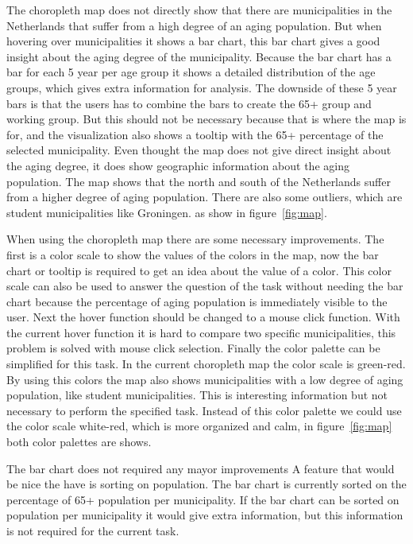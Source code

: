 The choropleth map does not directly show that there are municipalities in the Netherlands that suffer from a high degree of an aging population.
But when hovering over municipalities it shows a bar chart, this bar chart gives a good insight about the aging degree of the municipality.
Because the bar chart has a bar for each 5 year per age group it shows a detailed distribution of the age groups, which gives extra information for analysis.
The downside of these 5 year bars is that the users has to combine the bars to create the 65+ group and working group.
But this should not be necessary because that is where the map is for, and the visualization also shows a tooltip with the 65+ percentage of the selected municipality.
Even thought the map does not give direct insight about the aging degree, it does show geographic information about the aging population.
The map shows that the north and south of the Netherlands suffer from a higher degree of aging population.
There are also some outliers, which are student municipalities like Groningen. as show in figure~\ref{fig:map}.

When using the choropleth map there are some necessary improvements.
The first is a color scale to show the values of the colors in the map, now the bar chart or tooltip is required to get an idea about the value of a color.
This color scale can also be used to answer the question of the task without needing the bar chart because the percentage of aging population is immediately visible to the user.
Next the hover function should be changed to a mouse click function.
With the current hover function it is hard to compare two specific municipalities, this problem is solved with mouse click selection.
Finally the color palette can be simplified for this task.
In the current choropleth map the color scale is green-red.
By using this colors the map also shows municipalities with a low degree of aging population, like student municipalities.
This is interesting information but not necessary to perform the specified task.
Instead of this color palette we could use the color scale white-red, which is more organized and calm, in figure~\ref{fig:map} both color palettes are shows.

The bar chart does not required any mayor improvements
A feature that would be nice the have is sorting on population.
The bar chart is currently sorted on the percentage of 65+ population per municipality.
If the bar chart can be sorted on population per municipality it would give extra information, but this information is not required for the current task.

